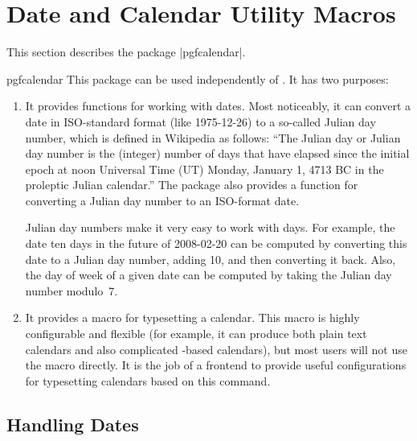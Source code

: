 %
%
%


\section{Date and Calendar Utility Macros}
\label{section-calendar}

This section describes the package |pgfcalendar|.

\begin{package}{pgfcalendar}
  This package can be used independently of \pgfname. It has two
  purposes:
  \begin{enumerate}
  \item It provides functions for working with dates. Most noticeably,
    it can convert a date in ISO-standard format (like 1975-12-26) to
    a so-called Julian day number, which is defined in Wikipedia as
    follows:  ``The Julian day or Julian day number is the
    (integer) number of days that have elapsed since the initial epoch
    at noon Universal Time (UT) Monday, January 1, 4713 BC in the
    proleptic Julian calendar.'' The package also provides a function
    for converting a Julian day number to an ISO-format date.

    Julian day numbers make it very easy to work with days. For
    example, the date ten days in the future of 2008-02-20 can
    be computed by converting this date to a Julian day number, adding
    10, and then converting it back. Also, the day of week of a given
    date can be computed by taking the Julian day number modulo~7.
  \item It provides a macro for typesetting a calendar. This macro
    is highly configurable and flexible (for example, it can produce
    both plain text calendars and also complicated \tikzname-based
    calendars), but most users will not use the macro directly. It is
    the job of a frontend to provide useful configurations for
    typesetting calendars based on this command.
  \end{enumerate}
\end{package}


\subsection{Handling Dates}

